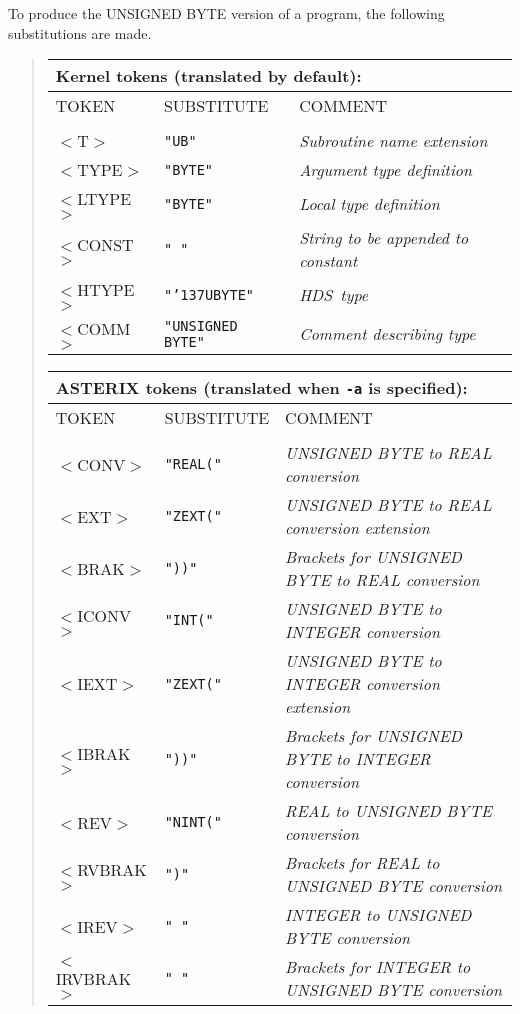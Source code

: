 \documentclass[twoside,11pt]{article}
\renewcommand{\_}{{\tt\char'137}}     %
\newcommand{\HDS}{{\footnotesize HDS}\normalsize}
\begin{document}
To produce the UNSIGNED BYTE version of a program, the following
substitutions are made.
\begin{quote}
\begin{tabular}{lll}
\multicolumn{3}{l}{\bf{Kernel} tokens (translated by default):} \\
\hline
TOKEN     &SUBSTITUTE     &COMMENT \\
\\
$<$T$>$       &{\tt "UB"}     &{\em Subroutine name extension} \\
$<$TYPE$>$    &{\tt "BYTE"}   &{\em Argument type definition} \\
$<$LTYPE$>$   &{\tt "BYTE"}   &{\em Local type definition} \\
$<$CONST$>$   &{\tt " "}      &{\em String to be appended to constant}\\
$<$HTYPE$>$   &{\tt "\_UBYTE"}  &{\em \HDS\ type} \\
$<$COMM$>$    &{\tt "UNSIGNED BYTE"} &{\em Comment describing type} \\
\end{tabular}

\begin{tabular}{lll}
\multicolumn{3}{l}{\bf{ASTERIX} tokens (translated when {\tt -a} is specified):} \\
\hline
TOKEN     &SUBSTITUTE     &COMMENT \\
\\
$<$CONV$>$  &{\tt "REAL("} &{\em UNSIGNED BYTE to REAL conversion} \\
$<$EXT$>$   &{\tt "ZEXT("} &{\em UNSIGNED BYTE to REAL conversion extension}\\
$<$BRAK$>$  &{\tt "))"} &{\em Brackets for UNSIGNED BYTE to REAL conversion}\\
$<$ICONV$>$ &{\tt "INT("}  &{\em UNSIGNED BYTE to INTEGER conversion} \\
$<$IEXT$>$  &{\tt "ZEXT("} &{\em UNSIGNED BYTE to INTEGER conversion extension}\\
$<$IBRAK$>$   &{\tt "))"}    &{\em Brackets for UNSIGNED BYTE to INTEGER conversion}\\
$<$REV$>$     &{\tt "NINT("} &{\em REAL to UNSIGNED BYTE conversion} \\
$<$RVBRAK$>$  &{\tt ")"}     &{\em Brackets for REAL to UNSIGNED BYTE conversion} \\
$<$IREV$>$    &{\tt " "} &{\em INTEGER to UNSIGNED BYTE conversion} \\
$<$IRVBRAK$>$ &{\tt " "} &{\em Brackets for INTEGER to UNSIGNED BYTE conversion}\\
\end{tabular}
\end{quote}
\end{document}
